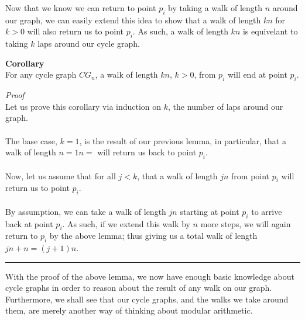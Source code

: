\documentclass[a4paper,12pt]{article}
\begin{document}
Now that we know we can return to point $p_i$ by taking a walk of length $n$ around our graph, we can easily extend this idea to show that a walk of length $kn$ for $k > 0$ will also return us to point $p_i$. As such, a walk of length $kn$ is equivelant to taking $k$ laps around our cycle graph.\\ 
\begin{tcolorbox}
\textbf{Corollary}\\
For any cycle graph $CG_n$, a walk of length $kn$, $k > 0$, from $p_i$ will end at point $p_i$.
\end{tcolorbox}
\noindent
\textit{Proof}\\
Let us prove this corollary via induction on $k$, the number of laps around our graph.\\
\\
The base case, $k=1$, is the result of our previous lemma, in particular, that a walk of length $n = 1n=$ will return us back to point $p_i$.\\
\\
Now, let us assume that for all $j < k$, that a walk of length $jn$ from point $p_i$ will return us to point $p_i$.\\
\\
By assumption, we can take a walk of length $jn$ starting at point $p_i$ to arrive back at point $p_i$. As such, if we extend this walk by $n$ more steps, we will again return to $p_i$ by the above lemma; thus giving us a total walk of length $jn +n = (j+1)n$.
\begin{center}
\noindent\rule{8cm}{0.4pt}
\end{center} 

With the proof of the above lemma, we now have enough basic knowledge about cycle graphs in order to reason about the result of any walk on our graph. Furthermore, we shall see that our cycle graphs, and the walks we take around them, are merely another way of thinking about modular arithmetic.\\
\end{document}
